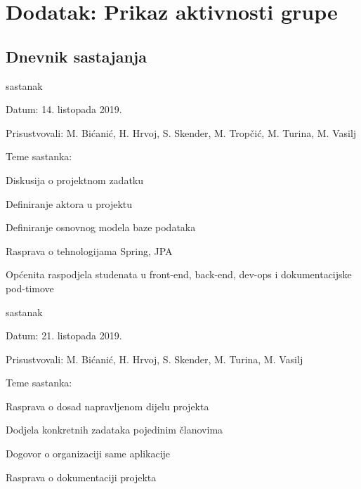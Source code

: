 \chapter*{Dodatak: Prikaz aktivnosti grupe}
		
		\section*{Dnevnik sastajanja}
		
		\begin{packed_enum}
			\item  sastanak
			
			\item[] \begin{packed_item}
				\item Datum: 14. listopada 2019.
				\item Prisustvovali: M. Bićanić, H. Hrvoj, S. Skender, M. Tropčić, M. Turina, M. Vasilj 
				\item Teme sastanka:
				\begin{packed_item}
					\item  Diskusija o projektnom zadatku
					\item  Definiranje aktora u projektu
					\item  Definiranje osnovnog modela baze podataka
					\item  Rasprava o tehnologijama Spring, JPA
					\item  Općenita raspodjela studenata u front-end, back-end, dev-ops i dokumentacijske pod-timove
				\end{packed_item}
			\end{packed_item}
			
			\item  sastanak
			\item[] \begin{packed_item}
				\item Datum: 21. listopada 2019.
				\item Prisustvovali: M. Bićanić, H. Hrvoj, S. Skender, M. Turina, M. Vasilj
				\item Teme sastanka:
				\begin{packed_item}
					\item  Rasprava o dosad napravljenom dijelu projekta
					\item  Dodjela konkretnih zadataka pojedinim članovima
					\item  Dogovor o organizaciji same aplikacije
					\item  Rasprava o dokumentaciji projekta
				\end{packed_item}
			\end{packed_item}
		

\end{packed_enum}
